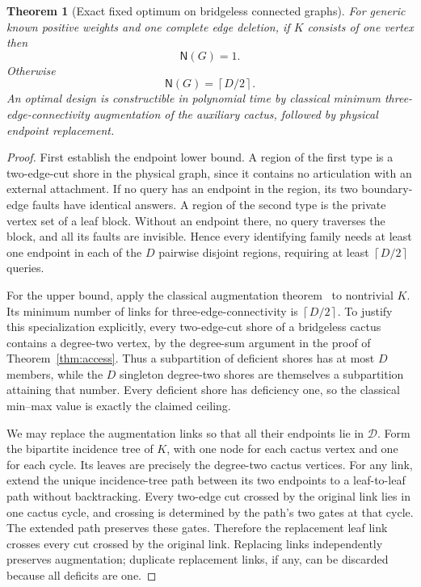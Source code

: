 \documentclass[11pt,letterpaper]{article}
\newtheorem{theorem}{Theorem}
\newcommand{\ceil}[1]{\left\lceil #1\right\rceil}
\newcommand{\N}{\mathsf N}
\begin{document}
\begin{theorem}[Exact fixed optimum on bridgeless connected graphs]\label{thm:bridgelessfixed}
For generic known positive weights and one complete edge deletion, if $K$ consists of one vertex then
\[
 \N(G)=1.
\]
Otherwise
\[
 \N(G)=\ceil{D/2}.
\]
An optimal design is constructible in polynomial time by classical minimum three-edge-connectivity augmentation of the auxiliary cactus, followed by physical endpoint replacement.
\end{theorem}
\begin{proof}
First establish the endpoint lower bound. A region of the first type is a two-edge-cut shore in the physical graph, since it contains no articulation with an external attachment. If no query has an endpoint in the region, its two boundary-edge faults have identical answers. A region of the second type is the private vertex set of a leaf block. Without an endpoint there, no query traverses the block, and all its faults are invisible. Hence every identifying family needs at least one endpoint in each of the $D$ pairwise disjoint regions, requiring at least $\ceil{D/2}$ queries.

For the upper bound, apply the classical augmentation theorem~\cite{WN,Szigeti} to nontrivial $K$. Its minimum number of links for three-edge-connectivity is $\ceil{D/2}$. To justify this specialization explicitly, every two-edge-cut shore of a bridgeless cactus contains a degree-two vertex, by the degree-sum argument in the proof of Theorem~\ref{thm:access}. Thus a subpartition of deficient shores has at most $D$ members, while the $D$ singleton degree-two shores are themselves a subpartition attaining that number. Every deficient shore has deficiency one, so the classical min--max value is exactly the claimed ceiling.

We may replace the augmentation links so that all their endpoints lie in $\mathcal D$. Form the bipartite incidence tree of $K$, with one node for each cactus vertex and one for each cycle. Its leaves are precisely the degree-two cactus vertices. For any link, extend the unique incidence-tree path between its two endpoints to a leaf-to-leaf path without backtracking. Every two-edge cut crossed by the original link lies in one cactus cycle, and crossing is determined by the path's two gates at that cycle. The extended path preserves these gates. Therefore the replacement leaf link crosses every cut crossed by the original link. Replacing links independently preserves augmentation; duplicate replacement links, if any, can be discarded because all deficits are one.


\end{proof}
\end{document}
